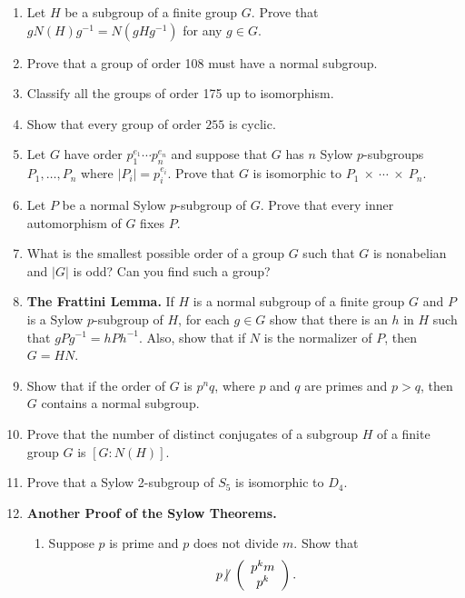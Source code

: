 {\begin{enumerate}
\item
Let $H$ be a subgroup of a finite group $G$. Prove that $g N(H) g^{-1}
= N(gHg^{-1})$ for any $g \in G$. 

\item
Prove that a group of order 108 must have a normal subgroup.

\item
Classify all the groups of order 175 up to isomorphism.

\item
Show that every group of order $255$ is cyclic.

\item
Let $G$ have order $p_1^{e_1} \cdots p_n^{e_n}$ and suppose that $G$
has $n$ Sylow \mbox{$p$-subgroups} $P_1, \ldots, P_n$ where 
$|P_i| = p_i^{e_i}$.  Prove that $G$ is isomorphic to 
$P_1~\times~\cdots~\times~P_n$. 
 
\item
Let $P$ be a normal Sylow $p$-subgroup of $G$.  Prove that every inner
automorphism of $G$ fixes $P$.  
 
 
\item
What is the smallest possible order of a group $G$ such that $G$ is
nonabelian and $|G|$ is odd?  Can you find such a group?
 
 
\item
{\bf The Frattini Lemma.}  
If $H$ is a normal subgroup of a finite group $G$ and $P$ is a Sylow
$p$-subgroup of $H$, for each $g \in G$ show that there is an $h$ in
$H$ such that $gPg^{-1} = hPh^{-1}$.  Also, show that if $N$ is the
normalizer of $P$, then $G= HN$. 
 
 
\item
Show that if the order of $G$ is $p^nq$, where $p$ and $q$ are primes
and $p>q$, then $G$ contains a normal subgroup. 
 
 
\item
Prove that the number of distinct conjugates of a subgroup $H$ of a 
finite group $G$ is $[G : N(H) ]$. 
 
 
\item
Prove that a Sylow 2-subgroup of $S_5$ is isomorphic to $D_4$.
 
 
\item
{\bf Another Proof of the Sylow Theorems.}
\begin{enumerate}
 
\item
Suppose $p$ is prime and $p$ does not divide $m$.  Show that
\[
p {\not\:\mid\ }
\left(
\begin{array}{c}
p^k m \\ p^k
\end{array}
\right).
\]
 

\end{enumerate}
\end{enumerate}}
